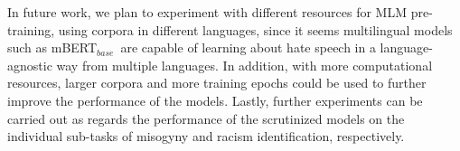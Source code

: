 \documentclass[
twocolumn,
]{ceurart}
\newcommand{\mbert}{\mbox{mBERT$_{base}$}}
\begin{document}
In future work, we plan to experiment with different resources for MLM pre-training, using corpora in different languages, since it seems multilingual models such as \mbert\, are capable of learning about hate speech in a language-agnostic way from multiple languages. In addition, with more computational resources, larger corpora and more training epochs could be used to further improve the performance of the models. Lastly, further experiments can be carried out as regards the performance of the scrutinized models on the individual sub-tasks of misogyny and racism identification, respectively.


\end{document}
